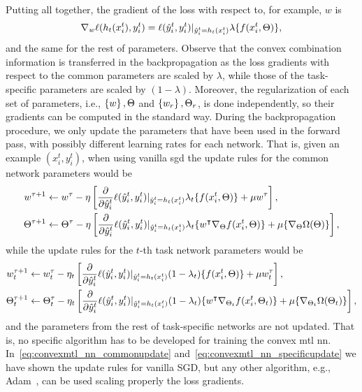 Putting all together, the gradient of the loss with respect to, for example, $w$ is 
$$  \nabla_w \ell(h_t(x_i^t), y_i^t)  =\ell(\hat{y}_i^t, y_i^t) \vert_{\hat{y}_i^t = h_t(x_i^t)} \lambda \lbrace f(x_i^t, \Theta) \rbrace , $$
and the same for the rest of parameters.
%
Observe that the convex combination information is transferred in the backpropagation as the loss gradients with respect to the common parameters are scaled by $\lambda$, while those of the task-specific parameters are scaled by $(1 - \lambda)$.
%
Moreover, the regularization of each set of parameters, i.e., $\left\{w\right\}, \Theta$ and $\left\{w_r\right\}, \Theta_r$, is done independently, so their gradients can be computed in the standard way.
%
During the backpropagation procedure, we only update the parameters that have been used in the forward pass, with possibly different learning rates for each network. 
That is, given an example $(x_i^t, y_i^t)$, when using vanilla \acrfull{sgd} the update rules for the common network parameters would be
\begin{equation}\label{eq:convexmtl_nn_commonupdate}
    \begin{aligned}
        w^{\tau + 1} &\gets w^\tau - \eta \left[  \frac{\partial}{\partial \hat{y}_i^t}  \lossf(\hat{y}_i^t, y_i^t) \vert_{\hat{y}_i^t = h_t(x_i^t)} \lambda_t \lbrace f(x_i^t, \Theta) \rbrace + \mu w^\tau \right], \\
        \Theta^{\tau + 1} &\gets \Theta^\tau - \eta \left[ \frac{\partial}{\partial \hat{y}_i^t}  \lossf(\hat{y}_i^t, y_i^t) \vert_{\hat{y}_i^t = h_t(x_i^t)}  \lambda_t \lbrace w^\intercal \nabla_\Theta f(x_i^t, \Theta)\rbrace + \mu \lbrace \nabla_\Theta \Omega( \Theta)  \rbrace \right],
    \end{aligned}
\end{equation}
while the update rules for the $t$-th task network parameters would be
\begin{equation}\label{eq:convexmtl_nn_specificupdate}
    \begin{aligned}
        w_t^{\tau + 1} &\gets w_t^\tau - \eta_t \left[  \frac{\partial}{\partial \hat{y}_i^t}  \lossf(\hat{y}_i^t, y_i^t) \vert_{\hat{y}_i^t = h_t(x_i^t)} (1 - \lambda_t) \lbrace f(x_i^t, \Theta) \rbrace + \mu w_t^\tau \right], \\
        \Theta_t^{\tau + 1} &\gets \Theta_t^\tau - \eta_t \left[ \frac{\partial}{\partial \hat{y}_i^t}  \lossf(\hat{y}_i^t, y_i^t) \vert_{\hat{y}_i^t = h_t(x_i^t)}  (1 - \lambda_t) \lbrace w^\intercal \nabla_{\Theta_t} f(x_i^t, \Theta_t)\rbrace + \mu \lbrace \nabla_{\Theta_t} \Omega( \Theta_t) \rbrace \right],
    \end{aligned}
\end{equation}
and the parameters from the rest of task-specific networks are not updated.
%
That is, no specific algorithm has to be developed for training the convex \acrshort{mtl} \acrshort{nn}. In~\eqref{eq:convexmtl_nn_commonupdate} and~\eqref{eq:convexmtl_nn_specificupdate} we have shown the update rules for vanilla SGD, but any other algorithm, e.g., Adam~\citep{KingmaB14}, can be used scaling properly the loss gradients.

